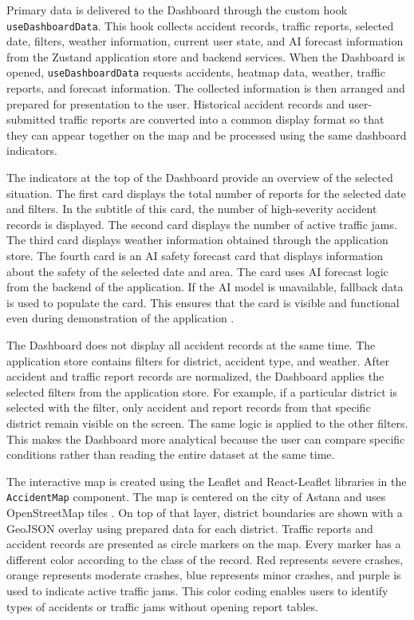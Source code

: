 ﻿\documentclass[12pt,a4paper]{report}
\begin{document}
Primary data is delivered to the Dashboard through the custom hook \texttt{useDashboardData}. This hook collects accident records, traffic reports, selected date, filters, weather information, current user state, and AI forecast information from the Zustand application store and backend services. When the Dashboard is opened, \texttt{useDashboardData} requests accidents, heatmap data, weather, traffic reports, and forecast information. The collected information is then arranged and prepared for presentation to the user. Historical accident records and user-submitted traffic reports are converted into a common display format so that they can appear together on the map and be processed using the same dashboard indicators.

The indicators at the top of the Dashboard provide an overview of the selected situation. The first card displays the total number of reports for the selected date and filters. In the subtitle of this card, the number of high-severity accident records is displayed. The second card displays the number of active traffic jams. The third card displays weather information obtained through the application store. The fourth card is an AI safety forecast card that displays information about the safety of the selected date and area. The card uses AI forecast logic from the backend of the application. If the AI model is unavailable, fallback data is used to populate the card. This ensures that the card is visible and functional even during demonstration of the application \cite{vlahogianni2014}.

The Dashboard does not display all accident records at the same time. The application store contains filters for district, accident type, and weather. After accident and traffic report records are normalized, the Dashboard applies the selected filters from the application store. For example, if a particular district is selected with the filter, only accident and report records from that specific district remain visible on the screen. The same logic is applied to the other filters. This makes the Dashboard more analytical because the user can compare specific conditions rather than reading the entire dataset at the same time.

The interactive map is created using the Leaflet and React-Leaflet libraries in the \texttt{AccidentMap} component. The map is centered on the city of Astana and uses OpenStreetMap tiles \cite{leafletDocs}. On top of that layer, district boundaries are shown with a GeoJSON overlay using prepared data for each district. Traffic reports and accident records are presented as circle markers on the map. Every marker has a different color according to the class of the record. Red represents severe crashes, orange represents moderate crashes, blue represents minor crashes, and purple is used to indicate active traffic jams. This color coding enables users to identify types of accidents or traffic jams without opening report tables.
\end{document}
